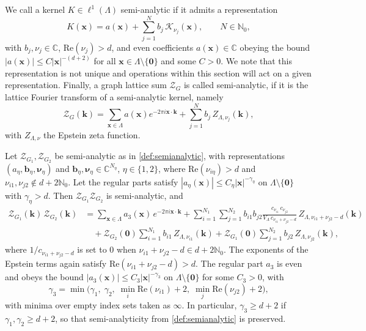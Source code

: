 \documentclass[10pt,a4paper]{amsart}
\begin{document}
\begin{definition}
\label{def:semianalytic}
We call a kernel $K\in\ell^1(\Lambda)$ semi-analytic if it admits a
representation
\[
K(\bm x)=a(\bm x)+\sum_{j=1}^{N}b_j\,\mathcal K_{\nu_j}(\bm x),
\qquad N\in\mathds N_0,
\]
with $b_j,\nu_j\in\mathds C$, $\mathrm{Re}(\nu_j)>d$, and even coefficients $a(\bm x)\in\mathds C$ obeying the bound $|a(\bm x)|\le C|\bm x|^{-(d+2)}$ for all $\bm x\in\Lambda\setminus\{\bm 0\}$ and some $C>0$. We note that this representation is not unique and operations within this section will act on a given representation. Finally, a graph lattice sum $\mathcal Z_G$ is called semi-analytic, if it is the lattice Fourier transform of a semi-analytic kernel, namely
\[
\mathcal Z_G(\bm k)=\sum_{\bm x\in\Lambda}a(\bm x)e^{-2\pi i\bm x\cdot\bm k}
+\sum_{j=1}^{N}b_j\,Z_{\Lambda,\nu_j}(\bm k),
\]
with $Z_{\Lambda,\nu}$ the Epstein zeta function.
\end{definition}

\begin{theorem}
\label{thm:multiplication}
Let $\mathcal Z_{G_1},\mathcal Z_{G_2}$ be semi-analytic as in \cref{def:semianalytic}, with representations $(a_\eta,\bm b_\eta,\bm\nu_\eta)$ and $\bm b_\eta,\bm\nu_\eta\in\mathds C^{N_\eta}$, $\eta\in\{1,2\}$, where $\mathrm{Re}(\nu_{i\eta})>d$ and $\nu_{i1},\nu_{j2}\notin d+2\mathds N_0$. Let the regular parts satisfy $|a_\eta(\bm x)|\le C_\eta|\bm x|^{-\gamma_\eta}$ on $\Lambda\setminus\{\bm 0\}$ with $\gamma_\eta>d$. Then $\mathcal Z_{G_1}\mathcal Z_{G_2}$ is semi-analytic, and
\[
\begin{aligned}
\mathcal Z_{G_1}(\bm k)\,\mathcal Z_{G_2}(\bm k)
&=\sum_{\bm x\in\Lambda}a_3(\bm x)\,e^{-2\pi i\bm x\cdot\bm k}+\sum_{i=1}^{N_1}\sum_{j=1}^{N_2} b_{i1}b_{j2}
\frac{c_{\nu_{i1}}\,c_{\nu_{j2}}}{V_\Lambda\,c_{\nu_{i1}+\nu_{j2}-d}}\,
Z_{\Lambda,\nu_{i1}+\nu_{j2}-d}(\bm k)\\
&\quad+\mathcal Z_{G_2}(\bm 0)\sum_{i=1}^{N_1}b_{i1}\,Z_{\Lambda,\nu_{i1}}(\bm k)
+\mathcal Z_{G_1}(\bm 0)\sum_{j=1}^{N_2}b_{j2}\,Z_{\Lambda,\nu_{j2}}(\bm k),
\end{aligned}
\]
where $1/c_{\nu_{i1}+\nu_{j2}-d}$ is set to $0$ when
$\nu_{i1}+\nu_{j2}-d\in d+2\mathds N_0$. The exponents of the Epstein terms again satisfy
$\mathrm{Re}(\nu_{i1}+\nu_{j2}-d)>d$. The regular part $a_3$ is even and obeys the bound
$|a_3(\bm x)|\le C_3|\bm x|^{-\gamma_3}$ on $\Lambda\setminus\{\bm 0\}$ for some
$C_3>0$, with
\[
\gamma_3=\min\Big(\gamma_1,\;\gamma_2,\;\min_{i}\mathrm{Re}(\nu_{i1})+2,\;\min_{j}\mathrm{Re}(\nu_{j2})+2\Big),
\]
with minima over empty index sets taken as $\infty$. In particular, $\gamma_3\ge d+2$ if $\gamma_1,\gamma_2\ge d+2$, so that semi-analyticity from \cref{def:semianalytic} is preserved.
\end{theorem}
\end{document}
